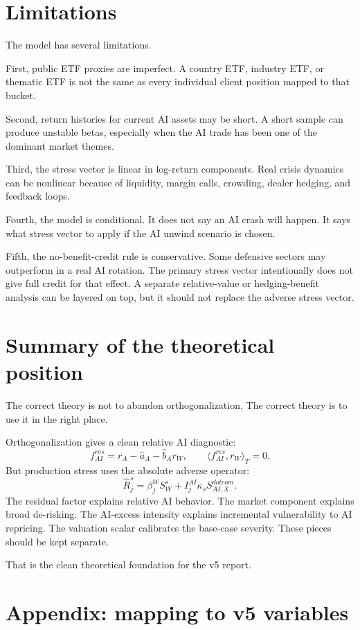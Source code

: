 \documentclass[11pt]{article}
\begin{document}
\section{Limitations}

The model has several limitations.

First, public ETF proxies are imperfect. A country ETF, industry ETF, or thematic ETF is not the same as every individual client position mapped to that bucket.

Second, return histories for current AI assets may be short. A short sample can produce unstable betas, especially when the AI trade has been one of the dominant market themes.

Third, the stress vector is linear in log-return components. Real crisis dynamics can be nonlinear because of liquidity, margin calls, crowding, dealer hedging, and feedback loops.

Fourth, the model is conditional. It does not say an AI crash will happen. It says what stress vector to apply if the AI unwind scenario is chosen.

Fifth, the no-benefit-credit rule is conservative. Some defensive sectors may outperform in a real AI rotation. The primary stress vector intentionally does not give full credit for that effect. A separate relative-value or hedging-benefit analysis can be layered on top, but it should not replace the adverse stress vector.

\section{Summary of the theoretical position}

The correct theory is not to abandon orthogonalization. The correct theory is to use it in the right place.

Orthogonalization gives a clean relative AI diagnostic:
\[
f_{AI}^{res}=r_A-\widehat a_A-\widehat b_A r_W,
\qquad \langle f_{AI}^{res},r_W\rangle_T=0.
\]
But production stress uses the absolute adverse operator:
\[
\widehat R_j^s=\beta_j^W S_W^s+I_j^{AI}\kappa_s S_{AI,X}^{dotcom}.
\]
The residual factor explains relative AI behavior. The market component explains broad de-risking. The AI-excess intensity explains incremental vulnerability to AI repricing. The valuation scalar calibrates the base-case severity. These pieces should be kept separate.

That is the clean theoretical foundation for the v5 report.

\section*{Appendix: mapping to v5 variables}
\end{document}
